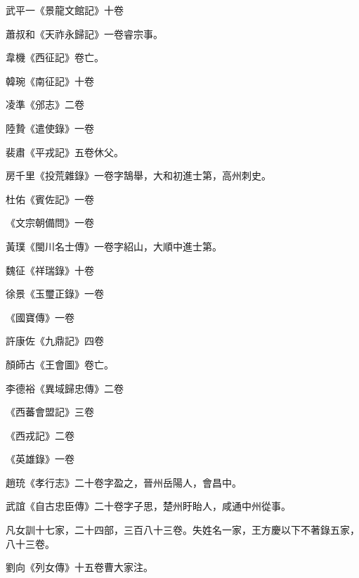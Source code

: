 \begin{pinyinscope}
 武平一《景龍文館記》十卷



 蕭叔和《天祚永歸記》一卷睿宗事。



 韋機《西征記》卷亡。



 韓琬《南征記》十卷



 凌準《邠志》二卷



 陸贄《遣使錄》一卷



 裴肅《平戎記》五卷休父。



 房千里《投荒雜錄》一卷字鵠舉，大和初進士第，高州刺史。



 杜佑《賓佐記》一卷



 《文宗朝備問》一卷



 黃璞《閩川名士傳》一卷字紹山，大順中進士第。



 魏征《祥瑞錄》十卷



 徐景《玉璽正錄》一卷



 《國寶傳》一卷



 許康佐《九鼎記》四卷



 顏師古《王會圖》卷亡。



 李德裕《異域歸忠傳》二卷



 《西蕃會盟記》三卷



 《西戎記》二卷



 《英雄錄》一卷



 趙珫《孝行志》二十卷字盈之，晉州岳陽人，會昌中。



 武誼《自古忠臣傳》二十卷字子思，楚州盱眙人，咸通中州從事。



 凡女訓十七家，二十四部，三百八十三卷。失姓名一家，王方慶以下不著錄五家，八十三卷。



 劉向《列女傳》十五卷曹大家注。




\end{pinyinscope}
